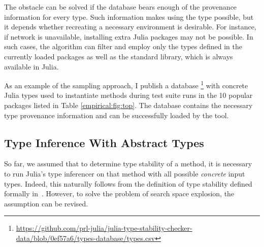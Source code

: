 The obstacle can be solved if the database bears enough
of the provenance information for every type. Such information makes using the
type possible, but %
it depends whether recreating a necessary environment is desirable.
For instance, if network is unavailable, installing extra Julia packages 
may not be possible.
In such cases, the algorithm can filter and
employ only the types defined in the currently loaded packages as well as 
the standard library, which is always available in Julia.

As an example of the sampling approach, I publish a database%
\footnote{%
  \url{https://github.com/prl-julia/julia-type-stability-checker-data/blob/0ef57a6/types-database/types.csv}}
with concrete Julia types used to instantiate methods during test suite runs in
the 10 popular packages listed in Table \ref{empirical:fig:top}. The database
contains the necessary type provenance information and can be successfully
loaded by the tool.



\subsection{Type Inference With Abstract Types}%
\label{ssec:approx:space:abstract}

So far, we assumed that to determine type stability of a method, it is necessary
to run Julia's type inferencer on that method with all possible \emph{concrete} input
types. Indeed, this naturally follows from %
the definition of type stability defined formally in~.
However, to solve the problem of search space explosion, 
the assumption can be revised.

